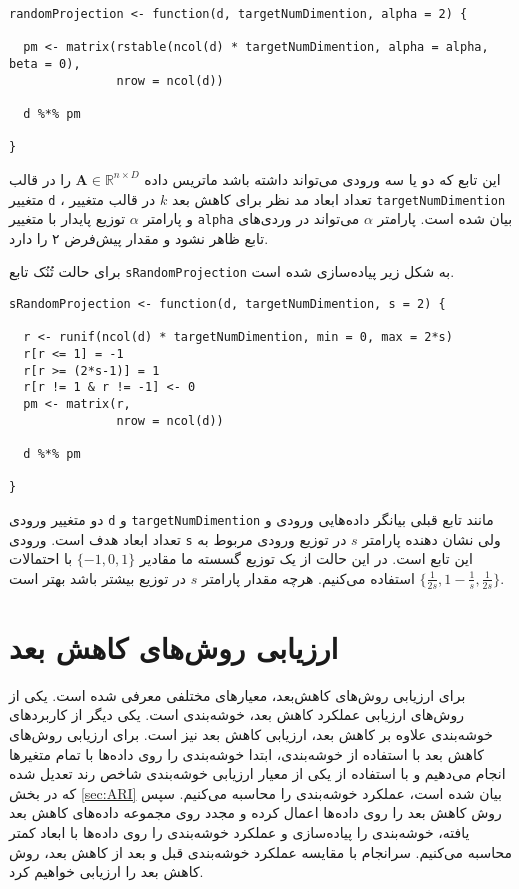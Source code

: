 \begin{latin}
\begin{Verbatim}[baselinestretch=0.75]
randomProjection <- function(d, targetNumDimention, alpha = 2) {
  
  pm <- matrix(rstable(ncol(d) * targetNumDimention, alpha = alpha, beta = 0),
               nrow = ncol(d))
  
  d %*% pm
  
}
\end{Verbatim}
\end{latin}

این تابع که دو یا سه ورودی می‌تواند داشته باشد ماتریس داده 
$\mathbf{A} \in \mathbb{R}^{n \times D}$
را در قالب متغییر 
\verb|d|%
، تعداد ابعاد مد نظر برای  کاهش بعد
$k$
در قالب متغییر
\verb|targetNumDimention|
و پارامتر 
$\alpha$
توزیع پایدار با متغییر
\verb|alpha|
بیان شده است. پارامتر 
$\alpha$
می‌تواند در وردی‌های تابع ظاهر نشود و مقدار پیش‌فرض ۲ را دارد.

برای حالت تُنُک تابع 
\verb|sRandomProjection|
به شکل زیر پیاده‌سازی شده است.

\begin{latin}
\begin{Verbatim}[baselinestretch=0.75]
sRandomProjection <- function(d, targetNumDimention, s = 2) {
  
  r <- runif(ncol(d) * targetNumDimention, min = 0, max = 2*s)
  r[r <= 1] = -1
  r[r >= (2*s-1)] = 1
  r[r != 1 & r != -1] <- 0
  pm <- matrix(r,
               nrow = ncol(d))
  
  d %*% pm
  
}
\end{Verbatim}
\end{latin}

دو متغییر ورودی 
\verb|d|
و
\verb|targetNumDimention|
مانند تابع قبلی بیانگر داده‌هایی ورودی و تعداد ابعاد هدف است. ورودی
\verb|s|
ولی نشان دهنده پارامتر
$s$
در توزیع ورودی مربوط به این تابع است. در این حالت از یک توزیع گسسته‌ ما مقادیر 
$\{-1, 0, 1\}$
با احتمالات
$\{ \frac{1}{2s}, 1-\frac{1}{s}, \frac{1}{2s} \}$
استفاده می‌کنیم. هرچه مقدار پارامتر 
$s$
در توزیع بیشتر باشد بهتر است.



\section{
ارزیابی روش‌های کاهش بعد
}

برای ارزیابی روش‌های کاهش‌بعد، معیا‌ر‌های مختلفی معرفی شده است.%
\cite{gracia2014methodology}
یکی از روش‌های ارزیابی عملکرد کاهش بعد، خوشه‌بندی است. یکی دیگر از کاربردهای خوشه‌بندی علاوه بر کاهش بعد، ارزیابی کاهش بعد نیز است. برای ارزیابی روش‌های کاهش بعد با استفاده از خوشه‌بندی، ابتدا خوشه‌بندی را روی داده‌ها با تمام متغیرها انجام می‌دهیم و با استفاده از یکی از معیار ارزیابی خوشه‌بندی شاخص رند تعدیل شده که در بخش 
\ref{sec:ARI}
بیان شده است، عملکرد خوشه‌بندی را محاسبه می‌کنیم. سپس روش کاهش بعد را روی داده‌ها اعمال کرده و مجدد روی مجموعه داده‌های کاهش بعد یافته، خوشه‌بندی را پیاده‌سازی و عملکرد خوشه‌بندی را روی داده‌ها با ابعاد کمتر محاسبه می‌کنیم. سرانجام با مقایسه عملکرد خوشه‌بندی قبل و بعد از کاهش بعد، روش کاهش بعد را ارزیابی خواهیم کرد.

